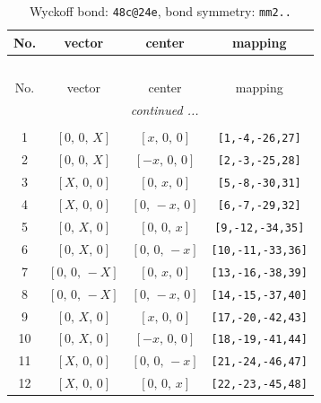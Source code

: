 \documentclass[fleqn,8pt]{jsarticle}
\begin{document}
\renewcommand{\arraystretch}{1.2}
\begin{longtable}{cccc}
\caption{Wyckoff bond: {\tt 48c@24e}, bond symmetry: {\tt mm2..}}
 \\
 \hline \hline
No. & vector & center & mapping \\ \hline \endfirsthead

\multicolumn{3}{l}{\tablename\ \thetable{}} \\
 \hline \hline
No. & vector & center & mapping \\ \hline \endhead

 \hline \hline
\multicolumn{3}{r}{\footnotesize\it continued ...} \\ \endfoot

 \hline \hline
\multicolumn{3}{r}{} \\ \endlastfoot

1 & $\left[ 0,\, 0,\, X \right]$ & $\left[ x,\, 0,\, 0 \right]$ & {\tt [1,-4,-26,27]} \\ \hline
2 & $\left[ 0,\, 0,\, X \right]$ & $\left[ - x,\, 0,\, 0 \right]$ & {\tt [2,-3,-25,28]} \\ \hline
3 & $\left[ X,\, 0,\, 0 \right]$ & $\left[ 0,\, x,\, 0 \right]$ & {\tt [5,-8,-30,31]} \\ \hline
4 & $\left[ X,\, 0,\, 0 \right]$ & $\left[ 0,\, - x,\, 0 \right]$ & {\tt [6,-7,-29,32]} \\ \hline
5 & $\left[ 0,\, X,\, 0 \right]$ & $\left[ 0,\, 0,\, x \right]$ & {\tt [9,-12,-34,35]} \\ \hline
6 & $\left[ 0,\, X,\, 0 \right]$ & $\left[ 0,\, 0,\, - x \right]$ & {\tt [10,-11,-33,36]} \\ \hline
7 & $\left[ 0,\, 0,\, - X \right]$ & $\left[ 0,\, x,\, 0 \right]$ & {\tt [13,-16,-38,39]} \\ \hline
8 & $\left[ 0,\, 0,\, - X \right]$ & $\left[ 0,\, - x,\, 0 \right]$ & {\tt [14,-15,-37,40]} \\ \hline
9 & $\left[ 0,\, X,\, 0 \right]$ & $\left[ x,\, 0,\, 0 \right]$ & {\tt [17,-20,-42,43]} \\ \hline
10 & $\left[ 0,\, X,\, 0 \right]$ & $\left[ - x,\, 0,\, 0 \right]$ & {\tt [18,-19,-41,44]} \\ \hline
11 & $\left[ X,\, 0,\, 0 \right]$ & $\left[ 0,\, 0,\, - x \right]$ & {\tt [21,-24,-46,47]} \\ \hline
12 & $\left[ X,\, 0,\, 0 \right]$ & $\left[ 0,\, 0,\, x \right]$ & {\tt [22,-23,-45,48]} \\
\end{longtable}
\end{document}
